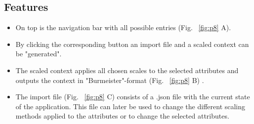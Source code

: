 \documentclass[]{article}
\begin{document}
\subsection{Features}
\begin{itemize}
	\item On top is the navigation bar with all possible entries (Fig. ~\ref{fig:p8} A). 
    \item By clicking the corresponding button an import file and a scaled context can be "generated".
    \item The scaled context applies all chosen scales to the selected attributes and outputs the context in "Burmeister"-format (Fig. ~\ref{fig:p8} B) .
    \item The import file (Fig. ~\ref{fig:p8} C) consists of a .json file with the current state of the application. This file can later be used to change the different scaling methods applied to the attributes or to change the selected attributes.
\end{itemize}
\end{document}
